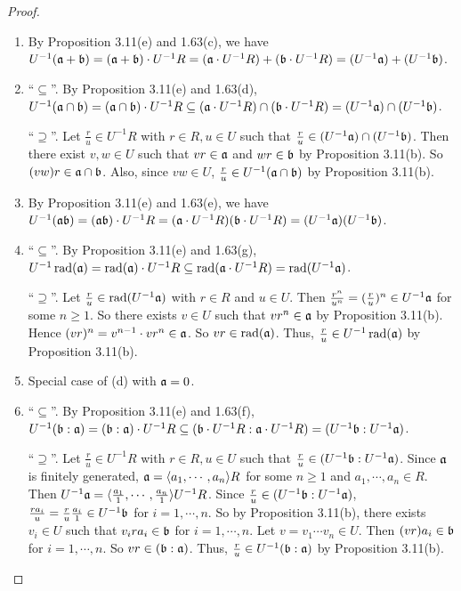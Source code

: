 \begin{proof}
    \begin{enumerate}
        \item By Proposition 3.11(e) and 1.63(c), we have $U^{-1}(\mathfrak{a}+\mathfrak{b}) = (\mathfrak{a}+\mathfrak{b}) \cdot U^{-1}R = (\mathfrak{a} \cdot U^{-1}R) + (\mathfrak{b} \cdot U^{-1}R) = (U^{-1}\mathfrak{a}) + (U^{-1}\mathfrak{b})$.
        \item ``$\subseteq$''. By Proposition 3.11(e) and 1.63(d), $U^{-1}(\mathfrak{a} \cap \mathfrak{b}) = (\mathfrak{a} \cap \mathfrak{b}) \cdot U^{-1}R \subseteq (\mathfrak{a} \cdot U^{-1}R) \cap (\mathfrak{b} \cdot U^{-1}R) = (U^{-1}\mathfrak{a}) \cap (U^{-1}\mathfrak{b})$. \par 
            ``$\supseteq$''. Let $\frac{r}{u} \in U^{-1}R$ with $r \in R,u \in U$ such that $\frac{r}{u} \in (U^{-1}\mathfrak{a}) \cap (U^{-1}\mathfrak{b})$. Then there exist $v,w \in U$ such that $vr \in \mathfrak{a}$ and $wr \in \mathfrak{b}$ by Proposition 3.11(b). So $(vw)r \in \mathfrak{a} \cap \mathfrak{b}$. Also, since $vw \in U$, $\frac{r}{u} \in U^{-1}(\mathfrak{a} \cap \mathfrak{b})$ by Proposition 3.11(b). \par
        \item By Proposition 3.11(e) and 1.63(e), we have $U^{-1}(\mathfrak{a}\mathfrak{b}) = (\mathfrak{a}\mathfrak{b}) \cdot U^{-1}R = (\mathfrak{a} \cdot U^{-1}R)(\mathfrak{b} \cdot U^{-1}R) = (U^{-1}\mathfrak{a})(U^{-1}\mathfrak{b})$.
        \item ``$\subseteq$''. By Proposition 3.11(e) and 1.63(g), $U^{-1} \operatorname{rad}(\mathfrak{a}) = \operatorname{rad}(\mathfrak{a}) \cdot U^{-1}R \subseteq \operatorname{rad}(\mathfrak{a} \cdot U^{-1}R) = \operatorname{rad}(U^{-1}\mathfrak{a})$. \par 
            ``$\supseteq$''. Let $\frac{r}{u} \in \operatorname{rad}(U^{-1}\mathfrak{a})$ with $r \in R$ and $u \in U$. Then $\frac{r^{n}}{u^{n}} = (\frac{r}{u})^{n} \in U^{-1}\mathfrak{a}$ for some $n \geq 1$. So there exists $v \in U$ such that $vr^{n} \in \mathfrak{a}$ by Proposition 3.11(b). Hence $(vr)^{n} = v^{n-1} \cdot vr^{n} \in \mathfrak{a}$. So $vr \in \operatorname{rad}(\mathfrak{a})$. Thus, $\frac{r}{u} \in U^{-1} \operatorname{rad}(\mathfrak{a})$ by Proposition 3.11(b).
        \item Special case of (d) with $\mathfrak{a} = 0$. 
        \item ``$\subseteq$''. By Proposition 3.11(e) and 1.63(f), $U^{-1}(\mathfrak{b}:\mathfrak{a}) = (\mathfrak{b}:\mathfrak{a}) \cdot U^{-1}R \subseteq (\mathfrak{b} \cdot U^{-1}R: \mathfrak{a} \cdot U^{-1}R) = (U^{-1}\mathfrak{b}:U^{-1}\mathfrak{a})$. \par 
            ``$\supseteq$''. Let $\frac{r}{u} \in U^{-1}R$ with $r \in R,u \in U$ such that $\frac{r}{u} \in (U^{-1}\mathfrak{b}:U^{-1}\mathfrak{a})$. Since $\mathfrak{a}$ is finitely generated, $\mathfrak{a} = \langle a_{1},\cdots,a_{n} \rangle R$ for some $n \geq 1$ and $a_{1},\cdots,a_{n} \in R$. Then $U^{-1}\mathfrak{a} = \langle \frac{a_{1}}{1},\cdots,\frac{a_{n}}{1} \rangle U^{-1}R$. Since $\frac{r}{u} \in (U^{-1}\mathfrak{b}:U^{-1}\mathfrak{a})$, $\frac{ra_{i}}{u} = \frac{r}{u} \frac{a_{i}}{1} \in U^{-1}\mathfrak{b}$ for $i = 1,\cdots,n$. So by Proposition 3.11(b), there exists $v_{i} \in U$ such that $v_{i} ra_{i} \in \mathfrak{b}$ for $i = 1,\cdots,n$. Let $v = v_{1} \cdots v_{n} \in U$. Then $(vr)a_{i} \in \mathfrak{b}$ for $i = 1,\cdots,n$. So $vr \in (\mathfrak{b}:\mathfrak{a})$. Thus, $\frac{r}{u} \in U^{-1}(\mathfrak{b}:\mathfrak{a})$ by Proposition 3.11(b). \qedhere
    \end{enumerate}
\end{proof}

